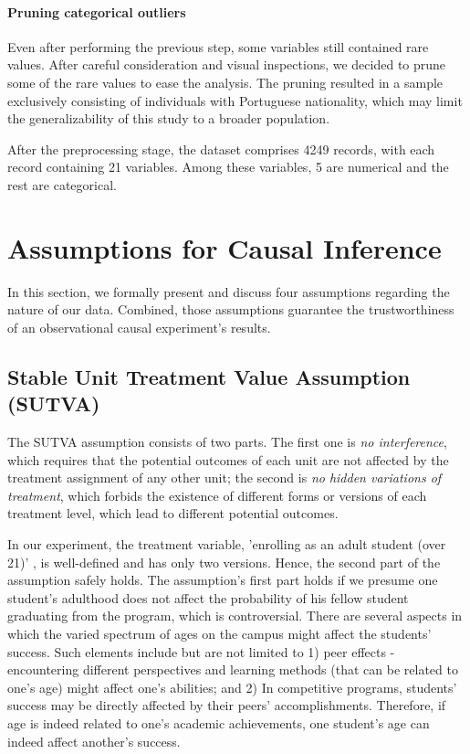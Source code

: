 \documentclass{article}
\newcommand{\todo}[1]{{\color{orange}{TODO: #1}}}
\newcommand{\gur}[1]{{\color{teal}{Gur: #1}}}
\begin{document}
\paragraph{Pruning categorical outliers} Even after performing the previous step, some variables still contained rare values. After careful consideration and visual inspections, we decided to prune some of the rare values to ease the analysis. The pruning resulted in a sample exclusively consisting of individuals with Portuguese nationality, which may limit the generalizability of this study to a broader population. 

\todo{scaling and encoding - I think that it can come later on in the analysis part, but don't forget!}

After the preprocessing stage, the dataset comprises 4249 records, with each record containing 21 variables. Among these variables, 5 are numerical and the rest are categorical.


\section{Assumptions for Causal Inference}

In this section, we formally present and discuss four assumptions regarding the nature of our data. Combined, those assumptions guarantee the trustworthiness of an observational causal experiment's results.

\subsection{Stable Unit Treatment Value Assumption (SUTVA)}

The SUTVA assumption consists of two parts. The first one is \emph{no interference}, which requires that the potential outcomes of each unit are not affected by the treatment assignment of any other unit; the second is \emph{no hidden variations of treatment}, which forbids the existence of different forms or versions of each treatment level, which lead to different potential outcomes.

In our experiment, the treatment variable, 'enrolling as an adult student (over 21)' \gur{is it?}, is well-defined and has only two versions. Hence, the second part of the assumption safely holds. The assumption's first part holds if we presume one student's adulthood does not affect the probability of his fellow student graduating from the program, which is controversial. There are several aspects in which the varied spectrum of ages on the campus might affect the students' success. Such elements include but are not limited to 1) peer effects - encountering different perspectives and learning methods (that can be related to one's age) might affect one's abilities; and 2) In competitive programs, students' success may be directly affected by their peers' accomplishments. Therefore, if age is indeed related to one's academic achievements, one student's age can indeed affect another's success.
\end{document}
